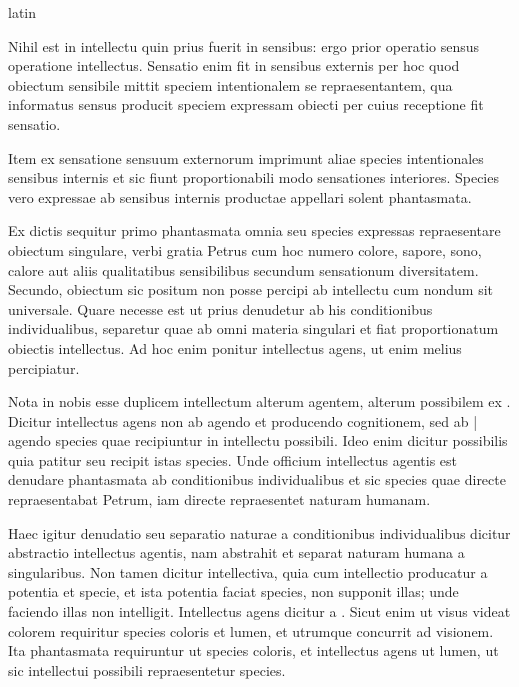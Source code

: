 \begin{otherlanguage*}{latin}
\pstart
{}
\pend

\pstart
{}
\pend

\pstart
Nihil est in intellectu quin prius fuerit in sensibus:
ergo prior operatio sensus operatione intellectus. Sensatio enim fit in sensibus externis per hoc quod obiectum sensibile mittit speciem intentionalem se repraesentantem, qua informatus sensus producit speciem expressam obiecti per cuius receptione fit sensatio. 
\pend

\pstart
Item ex sensatione sensuum externorum imprimunt aliae species intentionales sensibus internis et sic fiunt proportionabili modo sensationes interiores. Species vero expressae ab sensibus internis productae appellari solent phantasmata. 
\pend

\pstart
Ex dictis sequitur primo phantasmata omnia seu species expressas repraesentare obiectum singulare, verbi gratia Petrus cum hoc numero colore, sapore, sono, calore aut aliis qualitatibus sensibilibus secundum sensationum diversitatem. Secundo, obiectum sic positum non posse percipi ab intellectu cum nondum sit universale. Quare necesse est ut prius denudetur ab his conditionibus individualibus, separetur quae ab omni materia singulari et fiat proportionatum obiectis intellectus. Ad hoc enim ponitur intellectus agens, ut enim melius percipiatur. 
\pend

\pstart
Nota in nobis esse duplicem intellectum alterum agentem, alterum possibilem ex . Dicitur intellectus agens non ab agendo et producendo cognitionem, sed ab \textnormal{|} agendo species quae recipiuntur in intellectu possibili. Ideo enim dicitur possibilis quia patitur seu recipit istas species. Unde officium intellectus agentis est denudare phantasmata ab conditionibus individualibus et sic species quae directe repraesentabat Petrum, iam directe repraesentet naturam humanam. 
\pend

\pstart
Haec igitur denudatio seu separatio naturae a conditionibus individualibus dicitur abstractio intellectus agentis, nam abstrahit et separat naturam humana a singularibus. Non tamen dicitur intellectiva, quia cum intellectio producatur a potentia et specie, et ista potentia faciat species, non supponit illas; unde faciendo illas non intelligit. Intellectus agens dicitur a . Sicut enim ut visus videat colorem requiritur species coloris et lumen, et utrumque concurrit ad visionem. Ita phantasmata requiruntur ut species coloris, et intellectus agens ut lumen, ut sic intellectui possibili repraesentetur species. 
\pend


\end{otherlanguage*}
